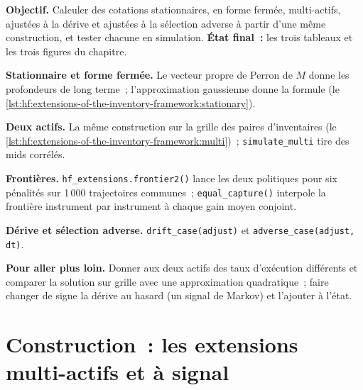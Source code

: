 \begin{tutorial}
\textbf{Objectif.} Calculer des cotations stationnaires, en forme fermée, multi-actifs, ajustées à la dérive et ajustées à la sélection adverse à partir d'une même construction, et tester
chacune en simulation. \textbf{État final~:} les trois tableaux et les trois figures du chapitre.
\begin{tutsteps}
\item \textbf{Stationnaire et forme fermée.} Le vecteur propre de Perron de $M$ donne les profondeurs de long terme~; l'approximation gaussienne donne la
formule (le \cref{lst:hf:extensions-of-the-inventory-framework:stationary}).
\label{lst:hf:extensions-of-the-inventory-framework:stationary}
\item \textbf{Deux actifs.} La même construction sur la grille des paires d'inventaires
(le \cref{lst:hf:extensions-of-the-inventory-framework:multi})~; \texttt{simulate\_multi} tire des mids corrélés.
\label{lst:hf:extensions-of-the-inventory-framework:multi}
\item \textbf{Frontières.} \texttt{hf\_extensions.frontier2()} lance les deux politiques pour six pénalités sur 1\,000 trajectoires communes~;
\texttt{equal\_capture()} interpole la frontière instrument par instrument à chaque gain moyen conjoint.
\item \textbf{Dérive et sélection adverse.} \texttt{drift\_case(adjust)} et \texttt{adverse\_case(adjust, dt)}.
\end{tutsteps}
\textbf{Pour aller plus loin.} Donner aux deux actifs des taux d'exécution différents et comparer la solution sur grille avec une approximation quadratique~; faire changer de signe la
dérive au hasard (un signal de Markov) et l'ajouter à l'état.
\end{tutorial}

\section{Construction~: les extensions multi-actifs et à signal}\label{bld:hf:extensions-of-the-inventory-framework:multimm}

